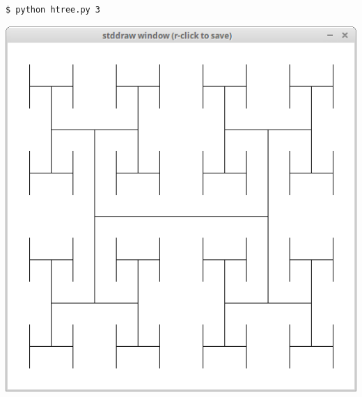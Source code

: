 \documentclass[8pt,a4paper,compress]{beamer}
\begin{document}
\begin{frame}[fragile]
\begin{minipage}{160pt}
\begin{lstlisting}[language={}]
$ python htree.py 3
\end{lstlisting}
\end{minipage}%
\begin{minipage}{140pt}
\hfill \includegraphics[scale=0.15]{figures/htree2.png}
\end{minipage}

\smallskip


\end{frame}
\end{document}
